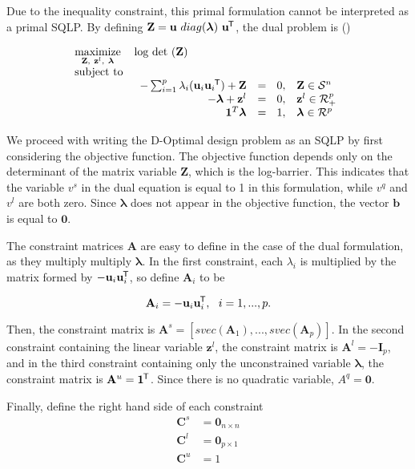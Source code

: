 \documentclass{article}
\newcommand{\ve}[1]{\mathbf{#1}}           %
\newcommand{\sv}[1]{\boldsymbol{#1}}   %
\newcommand{\m}[1]{\mathbf{#1}}               %
\newcommand{\tr}[1]{{#1}^{\mkern-1.5mu\mathsf{T}}}              %
\begin{document}
Due to the inequality constraint, this primal formulation cannot be interpreted as a primal SQLP. By defining $\m{Z} = \ve{u}~diag(\sv{\lambda})~\tr{\ve{u}}$, the dual problem is (\cite{toh1999sdpt3}) 

\[
\begin{array}{ll}
\underset{\m{Z},~\ve{z}^{l},~\sv{\lambda}}{\text{maximize}} & \text{log det}~(\m{Z})\\
\text{subject to} &\\
& 
\begin{array}{rll}
-\sum_{i=1}^{p} \lambda_{i}(\ve{u}_{i}\tr{\ve{u}_{i}}) + \m{Z} &=~~0, & \m{Z} \in \mathcal{S}^{n} \\
-\sv{\lambda} + \ve{z}^{l} & =~~0, & \ve{z}^{l} \in \mathcal{R}^{p}_{+} \\
\ve{1}^{T}\sv{\lambda} & =~~1, & \sv{\lambda} \in \mathcal{R}^{p} \\
\end{array}
\end{array}
\]

We proceed with writing the D-Optimal design problem as an SQLP by first considering the objective function. The objective function depends only on the determinant of the matrix variable $\m{Z}$, which is the log-barrier. This indicates that the variable $v^{s}$ in the dual equation is equal to 1 in this formulation, while $v^{q}$ and $v^{l}$ are both zero. Since $\sv{\lambda}$ does not appear in the objective function, the vector $\ve{b}$ is equal to $\ve{0}$.

The constraint matrices $\m{A}$ are easy to define in the case of the dual formulation, as they multiply multiply $\sv{\lambda}$. In the first constraint, each $\lambda_{i}$ is multiplied by the matrix formed by $-\ve{u}_{i}\tr{\ve{u}}_{i}$, so define $\m{A}_{i}$ to be

\[
\m{A}_{i} = -\ve{u}_{i}\tr{\ve{u}}_{i},~~ i = 1,...,p.
\]

Then, the constraint matrix is $\m{A}^{s} = [svec(\m{A}_{1}),...,svec(\m{A}_{p})]$. In the second constraint containing the linear variable $\ve{z}^{l}$, the constraint matrix is $\m{A}^{l} = -\m{I}_{p}$, and in the third constraint containing only the unconstrained variable $\sv{\lambda}$, the constraint matrix is $\m{A}^{u} = \tr{\ve{1}}$. Since there is no quadratic variable, $A^{q} = \ve{0}$.

Finally, define the right hand side of each constraint
\[
\begin{array}{rl}
\m{C}^{s} &= \m{0}_{n\times n} \\
\m{C}^{l} &= \ve{0}_{p\times 1} \\
\m{C}^{u} &= 1
\end{array}
\]
\end{document}
